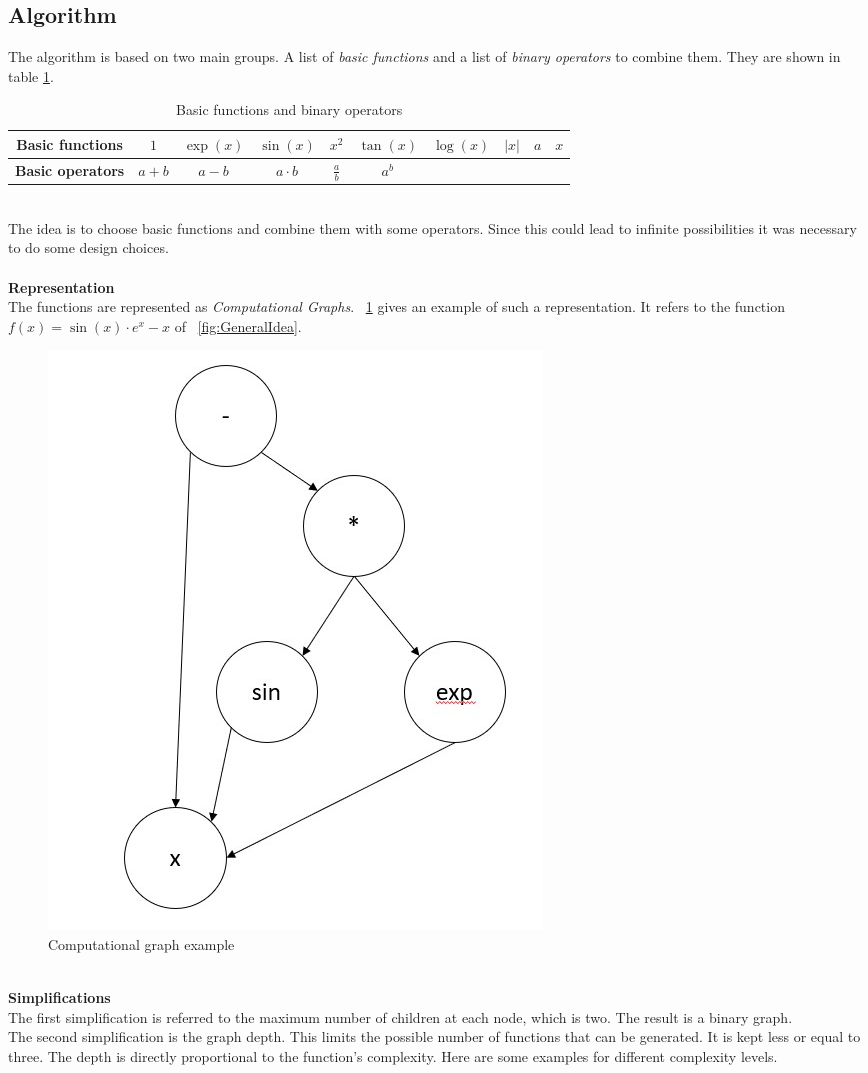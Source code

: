 \subsection{Algorithm}

The algorithm is based on two main groups. A list of \textit{basic functions} and a list of \textit{binary operators} to combine them. They are shown in table \ref{tab:BasicGroups}.
\begin{table}[h!]
	\centering
	\begin{tabular}{c|ccccccccc}
		\textbf{Basic functions} & \( 1 \) & \( \exp(x) \) & \( \sin(x) \) & \( x^2 \) & \( \tan(x) \) & \( \log(x) \) & \( |x| \) & \( a \) & \( x \) \\
		\hline
		\textbf{Basic operators} & \(a+b \) & \(a-b \) & \(a \cdot b \) & $\frac{a}{b}$ & \( a^b \) & & & &
	\end{tabular}
	\caption{Basic functions and binary operators}
	\label{tab:BasicGroups}
\end{table}\\The idea is to choose basic functions and combine them with some operators. Since this could lead to infinite possibilities it was necessary to do some design choices.\\
\\
\textbf{Representation}\\
The functions are represented as \textit{Computational Graphs}. \Fig~\ref{fig:ComputationalGraph} gives an example of such a representation. It refers to the function \(f(x) = \sin(x) \cdot e^x - x\) of \Fig~\ref{fig:GeneralIdea}.
\begin{figure}[h!]
	\centering
	\includegraphics[width=0.25\linewidth]{./ImageFiles/Data Generation/ComputationalGraph}
	\caption{Computational graph example}
	\label{fig:ComputationalGraph}
\end{figure}\\
\textbf{Simplifications}\\
The first simplification is referred to the maximum number of children at each node, which is two. The result is a binary graph.\\
The second simplification is the graph depth. This limits the possible number of functions that can be generated. It is kept less or equal to three. The depth is directly proportional to the function's complexity. Here are some examples for different complexity levels.\\
